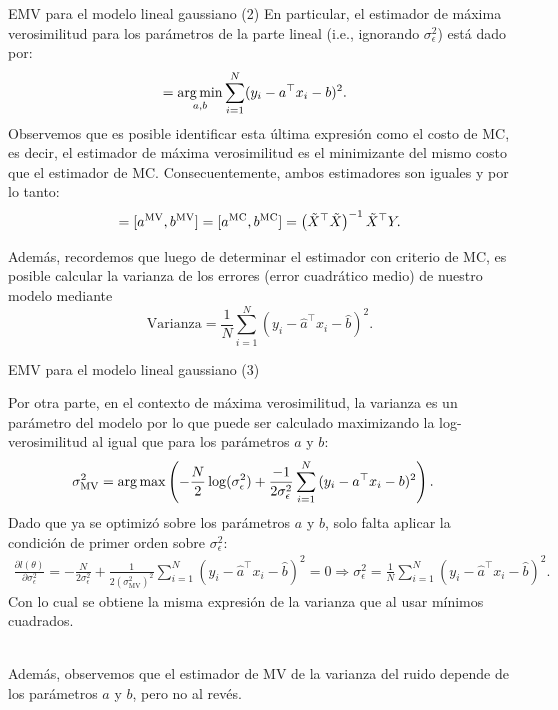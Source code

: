 \documentclass[handout, 9pt]{beamer}
\begin{document}
\begin{frame}{EMV para el modelo lineal gaussiano (2)}
	En particular, el estimador  de máxima verosimilitud para los parámetros de  la parte lineal (i.e., ignorando $\sigma^2_\epsilon$) está dado por:
\begin{align*}
	 [a^{\text{MV}} ,b^{\text{MV}} ]
						&= \argmin_{a,b} \sum_{i=1}^N (y_i-a^\top x_i - b)^2. \label{eq:theta_ML}
\end{align*}\pause
Observemos que es posible identificar esta última expresión como el costo de MC, es decir, el estimador de máxima verosimilitud es el minimizante del mismo costo que el estimador de MC. Consecuentemente, ambos estimadores son iguales y por lo tanto:
\begin{equation*}
	 [\hat{a},\hat{b}] = [a^{\text{MV}} ,b^{\text{MV}} ]=[a^{\text{MC}} ,b^{\text{MC}} ] = \left(\tX^\top\tX\right)^{-1} \tX^\top Y.
\end{equation*}\pause

Además, recordemos que luego de determinar el estimador con criterio de MC, es posible calcular la varianza de los errores (error cuadrático medio) de nuestro modelo mediante 
\begin{equation*}
	\text{Varianza} = \frac{1}{N}\sum_{i=1}^N (y_i-\hat{a}^\top x_i -\hat{b})^2.
\end{equation*}

\end{frame}

\begin{frame}{EMV para el modelo lineal gaussiano (3)}
	
Por otra parte, en el contexto de máxima verosimilitud, la varianza es un parámetro del modelo por lo que puede ser calculado maximizando la log-verosimilitud al igual que para los parámetros $a$ y $b$:
\begin{align*}
	\sigma^2_{\text{MV}} &= \operatorname*{arg\,max} \left(-\frac{N}{2} \log(\sigma_\epsilon^{2}) + \frac{-1}{2\sigma_\epsilon^2}\sum_{i=1}^N {(y_i-a^\top x_i -b)^2}\right).
\end{align*}
Dado que ya se optimizó sobre los parámetros $a$ y $b$, solo falta aplicar  la condición de primer orden sobre $\sigma_\epsilon^2$:
\begin{align*}
	\frac{\partial l(\theta)}{\partial \sigma_\epsilon^2} = -\frac{N}{2\sigma_\epsilon^2} + \frac{1}{2(\sigma^2_{\text{MV}})^2}\sum_{i=1}^N {(y_i-\hat{a}^\top x_i -\hat{b})^2} = 0 \Rightarrow \sigma_\epsilon^2 = \frac{1}{N}\sum_{i=1}^N {(y_i-\hat{a}^\top x_i -\hat{b})^2}.
\end{align*}
Con lo cual se obtiene la misma expresión de la varianza que al usar mínimos cuadrados. \\~\

Además, observemos que el estimador de MV de la varianza del ruido depende de los parámetros $a$ y $b$, pero no al revés.
	
\end{frame}
\end{document}
